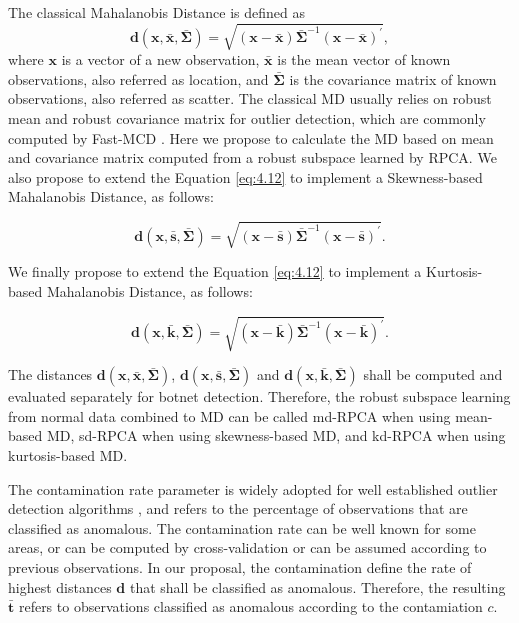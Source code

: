 The classical Mahalanobis Distance is defined as		
\begin{equation}\label{eq:4.12}
	\boldsymbol{d}(\boldsymbol{x},\bar{\boldsymbol{x}}, \boldsymbol{\bar{\Sigma}}) = \sqrt{(\boldsymbol{x} - \bar{\boldsymbol{x}}) \boldsymbol{\bar{\Sigma}}^{-1}(\boldsymbol{x} - \bar{\boldsymbol{x}})^\prime},
\end{equation}
where $\boldsymbol{x}$ is a vector of a new observation, $\bar{\boldsymbol{x}}$ is the mean vector of known observations, also referred as location, and $\boldsymbol{\bar{\Sigma}}$ is the covariance matrix of known observations, also referred as scatter. The classical MD usually relies on robust mean and robust covariance matrix for outlier detection, which are commonly computed by Fast-MCD \cite{rousseeuw1984mcd, rousseeuw1999fastmcd}. Here we propose to calculate the MD based on mean and covariance matrix computed from a robust subspace learned by RPCA. We also propose to extend the Equation \ref{eq:4.12} to implement a Skewness-based Mahalanobis Distance, as follows:

\begin{equation}\label{eq:4.13}
	\boldsymbol{d}(\boldsymbol{x}, \bar{\boldsymbol{s}}, \boldsymbol{\bar{\Sigma}}) = \sqrt{(\boldsymbol{x} - \bar{\boldsymbol{s}}) \boldsymbol{\bar{\Sigma}}^{-1}(\boldsymbol{x} - \bar{\boldsymbol{s}})^\prime}.
\end{equation}

We finally propose to extend the Equation \ref{eq:4.12} to implement a Kurtosis-based Mahalanobis Distance, as follows:

\begin{equation}\label{eq:4.14}
	\boldsymbol{d}(\boldsymbol{x}, \bar{\boldsymbol{k}}, \boldsymbol{\bar{\Sigma}}) = \sqrt{(\boldsymbol{x} - \bar{\boldsymbol{k}}) \boldsymbol{\bar{\Sigma}}^{-1}(\boldsymbol{x} - \bar{\boldsymbol{k}})^\prime}.
\end{equation}

The distances $\boldsymbol{d}(\boldsymbol{x},\bar{\boldsymbol{x}}, \boldsymbol{\bar{\Sigma}})$, $\boldsymbol{d}(\boldsymbol{x}, \bar{\boldsymbol{s}}, \boldsymbol{\bar{\Sigma}})$ and $\boldsymbol{d}(\boldsymbol{x}, \bar{\boldsymbol{k}}, \boldsymbol{\bar{\Sigma}})$ shall be computed and evaluated separately for botnet detection. Therefore, the robust subspace learning from normal data combined to MD can be called md-RPCA when using mean-based MD, sd-RPCA when using skewness-based MD, and kd-RPCA when using kurtosis-based MD.

The contamination rate parameter is widely adopted for well established outlier detection algorithms \cite{zhao2019pyod}, and refers to the percentage of observations that are classified as anomalous. The contamination rate can be well known for some areas, or can be computed by cross-validation or can be assumed according to previous observations. In our proposal, the contamination define the rate of highest distances $\boldsymbol{d}$ that shall be classified as anomalous. Therefore, the resulting $\boldsymbol{\bar{t}}$ refers to observations classified as anomalous according to the contamiation $c$.

